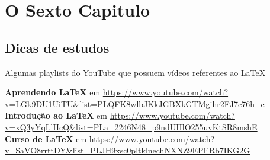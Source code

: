 \chapter{O Sexto Capitulo}

\section{Dicas de estudos}


Algumas playlists do YouTube que possuem vídeos referentes ao LaTeX
 
\textbf{Aprendendo LaTeX} em \url{https://www.youtube.com/watch?v=LGk9DU1UiTU&list=PLQFK8wlbJKkJGBXkGTMgihr2FJ7c76h_c} \\


\textbf{Introdução ao LaTeX} em \url{https://www.youtube.com/watch?v=xQ3yYqLlHcQ&list=PLa_2246N48_p9ndUHlO255uvKtSR8mshE} \\


\textbf{Curso de LaTeX} em \url{https://www.youtube.com/watch?v=SaVO8rrttDY&list=PLJH9xsc0pltklnechNXNZ9EPFRb7IKG2G} \\

